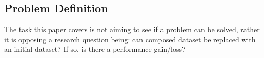 \subsection{Problem Definition}
The task this paper covers is not aiming to see if a problem can be solved, rather it is opposing a research question being: can composed dataset be replaced with an initial dataset? If so, is there a performance gain/loss?